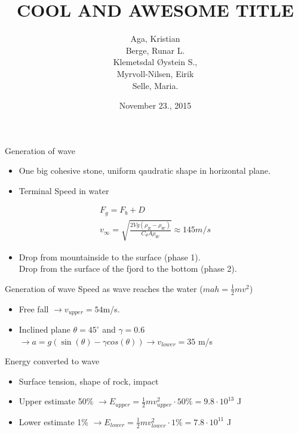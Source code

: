 \documentclass[screen]{beamer}
\title[Eksempelforedrag]%
{COOL AND AWESOME TITLE}
\author[aut]{Aga, Kristian \\ Berge, Runar L. \\ Klemetsdal Øystein S.,\\
	Myrvoll-Nilsen, Eirik \\ Selle, Maria.
}
\date{November 23., 2015}
\begin{document}
\ntnutitlepage

\begin{frame}{Generation of wave}
	\begin{itemize}
		\item %
		One big cohesive stone, uniform qaudratic shape in horizontal plane.
		\item Terminal Speed in water
	\end{itemize}
	\begin{align*}
		F_g=F_b+D\\
		v_{\infty}=\sqrt{\frac{2Vg(\rho_R-\rho_W)}{C_d A \rho_W}} \approx 145 m/s
	\end{align*}
	\begin{itemize}
		\item Drop from mountainside to the surface (phase 1).\\
		Drop from the surface of the fjord to the bottom (phase 2).
	\end{itemize}
	
\end{frame}


\begin{frame}{Generation of wave}
	Speed as wave reaches the water ($mah = \frac{1}{2}mv^2$)
	\begin{itemize}
		\item Free fall $\rightarrow v_{upper}=54$m/s.
		\item Inclined plane $\theta=45^{\circ}$ and $\gamma = 0.6$ $\rightarrow a=g(\sin(\theta) - \gamma cos(\theta)) \rightarrow v_{lower}=35$ m/s\\
	\end{itemize}
	\pause
	Energy converted to wave
	\begin{itemize}
		\item Surface tension, shape of rock, impact
		\item Upper estimate 50\% $\rightarrow E_{upper} =\frac{1}{2}m v_{upper}^2 \cdot 50\% = 9.8\cdot10^{13}$ J
		\item Lower estimate 1\% $\rightarrow E_{lower} =\frac{1}{2}m v_{lower}^2 \cdot 1\% = 7.8 \cdot 10^{11}$ J
	\end{itemize}
	
\end{frame}
\end{document}
